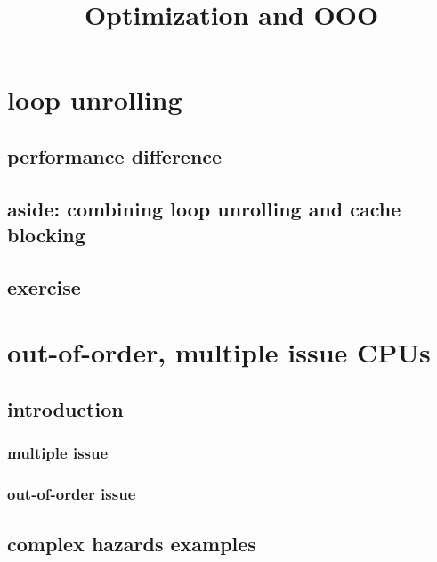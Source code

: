 \graphicspath{{./figures/}}
\title{Optimization and OOO}
\date{}



\section{loop unrolling}


\subsection{performance difference}


\subsection{aside: combining loop unrolling and cache blocking}


\subsection{exercise}


\section{out-of-order, multiple issue CPUs}

\subsection{introduction}



\subsubsection{multiple issue}


\subsubsection{out-of-order issue}


\subsection{complex hazards examples}

